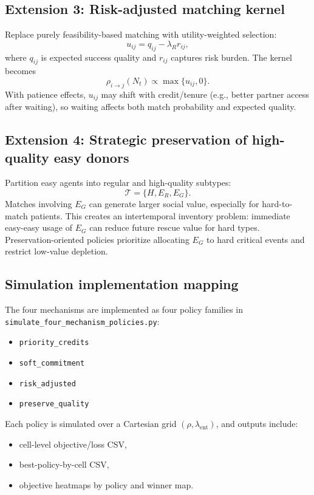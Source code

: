 \subsection{Extension 3: Risk-adjusted matching kernel}

Replace purely feasibility-based matching with utility-weighted selection:
\[
u_{ij}=q_{ij}-\lambda_R r_{ij},
\]
where \(q_{ij}\) is expected success quality and \(r_{ij}\) captures risk burden. The kernel becomes
\[
\rho_{i\to j}(N_t)\propto \max\{u_{ij},0\}.
\]
With patience effects, \(u_{ij}\) may shift with credit/tenure (e.g., better partner access after waiting), so waiting affects both match probability and expected quality.

\subsection{Extension 4: Strategic preservation of high-quality easy donors}

Partition easy agents into regular and high-quality subtypes:
\[
\mathcal{T}=\{H,E_R,E_G\}.
\]
Matches involving \(E_G\) can generate larger social value, especially for hard-to-match patients. This creates an intertemporal inventory problem: immediate easy-easy usage of \(E_G\) can reduce future rescue value for hard types. Preservation-oriented policies prioritize allocating \(E_G\) to hard critical events and restrict low-value depletion.

\subsection{Simulation implementation mapping}

The four mechanisms are implemented as four policy families in
\texttt{simulate\_four\_mechanism\_policies.py}:
\begin{itemize}
  \item \texttt{priority\_credits}
  \item \texttt{soft\_commitment}
  \item \texttt{risk\_adjusted}
  \item \texttt{preserve\_quality}
\end{itemize}

Each policy is simulated over a Cartesian grid \((\rho,\lambda_{\mathrm{ent}})\), and outputs include:
\begin{itemize}
  \item cell-level objective/loss CSV,
  \item best-policy-by-cell CSV,
  \item objective heatmaps by policy and winner map.
\end{itemize}

